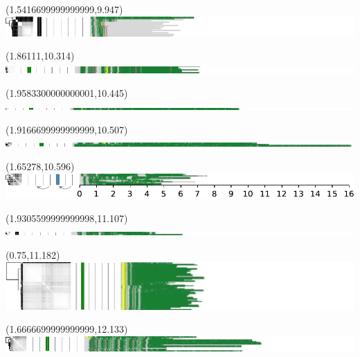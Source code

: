 \documentclass{article}
\begin{document}
\begin{textblock}{13}(1.5416699999999999,9.947)\includegraphics{./Figure_S5/chr15-HG001.pdf}\end{textblock}
\begin{textblock}{13}(1.86111,10.314)\includegraphics{./Figure_S5/chr15-HG002.pdf}\end{textblock}
\begin{textblock}{13}(1.9583300000000001,10.445)\includegraphics{./Figure_S5/chr15-HG003.pdf}\end{textblock}
\begin{textblock}{13}(1.9166699999999999,10.507)\includegraphics{./Figure_S5/chr15-HG004.pdf}\end{textblock}
\begin{textblock}{13}(1.65278,10.596)\includegraphics{./Figure_S5/chr15-HG005.pdf}\end{textblock}
\begin{textblock}{13}(1.9305599999999998,11.107)\includegraphics{./Figure_S5/18qtel_1-500K_1_12_12_rc-HG001.pdf}\end{textblock}
\begin{textblock}{13}(0.75,11.182)\includegraphics{./Figure_S5/18qtel_1-500K_1_12_12_rc-HG002.pdf}\end{textblock}
\begin{textblock}{13}(1.6666699999999999,12.133)\includegraphics{./Figure_S5/18qtel_1-500K_1_12_12_rc-HG003.pdf}\end{textblock}
\end{document}
